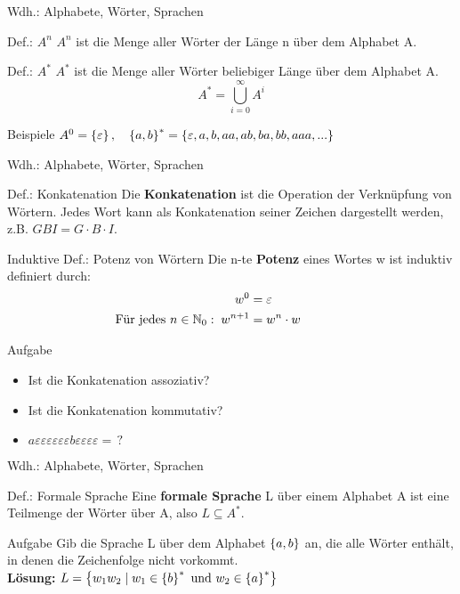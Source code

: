 \begin{frame}{Wdh.: Alphabete, Wörter, Sprachen}
	\begin{block}{Def.: \(A^{n}\)}
	\pause
		\textbf{\(A^{n}\)} ist die Menge aller Wörter der Länge n über dem Alphabet A.
	\end{block}
	\pause
	\begin{block}{Def.: \(A^{*}\)}
	\pause
		\textbf{\(A^{*}\)} ist die Menge aller Wörter beliebiger Länge über dem Alphabet A.		
		\[
			A^{*}= \bigcup_{i=0}^{\infty} A^{i}
		\]
	\end{block}
	\pause
	\begin{exampleblock}{Beispiele}
		\(A^{0}=\left\{ \varepsilon \right\}, \quad \left\{ a,b \right\}^{*} = \left\{ \varepsilon, a, b, aa, ab, ba, bb, aaa, ... \right\}\)
	\end{exampleblock}
\end{frame}

\begin{frame}{Wdh.: Alphabete, Wörter, Sprachen}
	\begin{block}{Def.: Konkatenation}
		Die \textbf{Konkatenation} ist die Operation der Verknüpfung von Wörtern. Jedes Wort kann als Konkatenation seiner Zeichen dargestellt werden, z.B. \(GBI = G \cdot B \cdot I\).
	\end{block}
	\pause
	\begin{block}{Induktive Def.: Potenz von Wörtern}
		Die n-te \textbf{Potenz} eines Wortes w ist induktiv definiert durch:
		\begin{align*}
				w^{0} &= \varepsilon \hphantom{000000000000}\\
				\text{Für jedes } n \in \mathbb{N}_{0}: \; w^{n+1} & = w^{n} \cdot w
		\end{align*}
	\end{block}
	\pause
	\begin{exampleblock}{Aufgabe}
	\begin{itemize}
		\item Ist die Konkatenation assoziativ?\pause
		\item Ist die Konkatenation kommutativ?\pause
		\item \(a\varepsilon\varepsilon\varepsilon\varepsilon\varepsilon\varepsilon b\varepsilon\varepsilon\varepsilon\varepsilon = \, ?\)
	\end{itemize}		
	\end{exampleblock}
\end{frame}

\begin{frame}{Wdh.: Alphabete, Wörter, Sprachen}
	\begin{block}{Def.: Formale Sprache}
		Eine \textbf{formale Sprache} L über einem Alphabet A ist eine Teilmenge der Wörter über A, also \(L \subseteq A^{*}\).
	\end{block}

	\begin{exampleblock}{Aufgabe}
		Gib die Sprache L über dem Alphabet \(\left\{ a,b \right\}\) an, die alle Wörter enthält, in denen die Zeichenfolge  nicht vorkommt.\\
		\pause
		\textbf{Lösung:} \(L = \left\{ w_{1}w_{2} \mid w_{1} \in \left\{ b \right\}^{*} \text{ und } w_{2} \in \left\{ a \right\}^{*} \right\}\)
	\end{exampleblock}
\end{frame}

